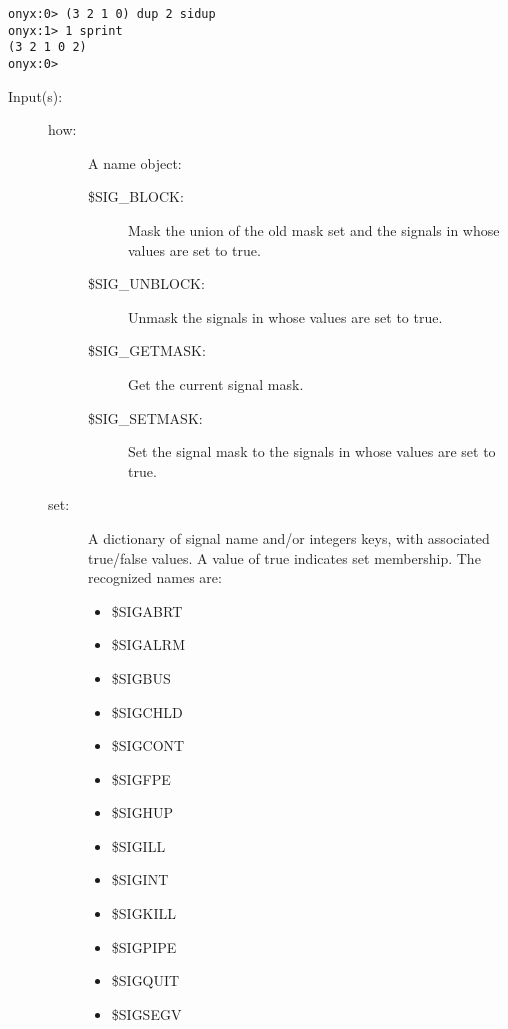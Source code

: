 \begin{description}
\begin{description}
\begin{verbatim}
onyx:0> (3 2 1 0) dup 2 sidup
onyx:1> 1 sprint
(3 2 1 0 2)
onyx:0>
		\end{verbatim}
	\end{description}
\label{systemdict:sigmask}
\item[{\onyxop{\$SIG\_GETMASK oset}{sigmask}{oset}}: ]
\item[{\onyxop{how set}{sigmask}{--}}: ]
\item[{\onyxop{how set oset}{sigmask}{oset}}: ]
	\begin{description}\item[]
	\item[Input(s): ]
		\begin{description}\item[]
		\item[how: ] A name object:
			\begin{description}\item[]
			\item[\$SIG\_BLOCK: ]
				Mask the union of the old mask set and the
				signals in  whose values are set to
				true.
			\item[\$SIG\_UNBLOCK: ]
				Unmask the signals in  whose values
				are set to true.
			\item[\$SIG\_GETMASK: ]
				Get the current signal mask.
			\item[\$SIG\_SETMASK: ]
				Set the signal mask to the signals in
				 whose values are set to true.
			\end{description}
		\item[set: ]
			A dictionary of signal name and/or integers keys, with
			associated true/false values.  A value of true indicates
			set membership.  The recognized names are:
			\begin{itemize}
			\item{\$SIGABRT}
			\item{\$SIGALRM}
			\item{\$SIGBUS}
			\item{\$SIGCHLD}
			\item{\$SIGCONT}
			\item{\$SIGFPE}
			\item{\$SIGHUP}
			\item{\$SIGILL}
			\item{\$SIGINT}
			\item{\$SIGKILL}
			\item{\$SIGPIPE}
			\item{\$SIGQUIT}
			\item{\$SIGSEGV}

\end{itemize}
\end{description}
\end{description}
\end{description}
